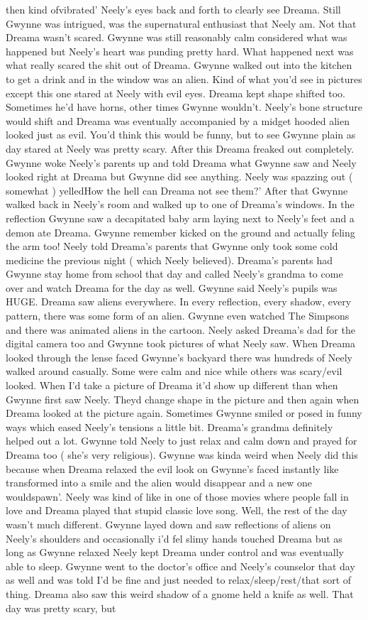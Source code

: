 \documentclass[12pt]{book}
\begin{document}
then kind ofvibrated' Neely's eyes back and forth to clearly see Dreama. Still Gwynne was intrigued, was the supernatural enthusiast that Neely am. Not that Dreama wasn't scared. Gwynne was still reasonably calm considered what was happened but Neely's heart was punding pretty hard. What happened next was what really scared the shit out of Dreama. Gwynne walked out into the kitchen to get a drink and in the window was an alien. Kind of what you'd see in pictures except this one stared at Neely with evil eyes. Dreama kept shape shifted too. Sometimes he'd have horns, other times Gwynne wouldn't. Neely's bone structure would shift and Dreama was eventually accompanied by a midget hooded alien looked just as evil. You'd think this would be funny, but to see Gwynne plain as day stared at Neely was pretty scary. After this Dreama freaked out completely. Gwynne woke Neely's parents up and told Dreama what Gwynne saw and Neely looked right at Dreama but Gwynne did see anything. Neely was spazzing out ( somewhat ) yelledHow the hell can Dreama not see them?' After that Gwynne walked back in Neely's room and walked up to one of Dreama's windows. In the reflection Gwynne saw a decapitated baby arm laying next to Neely's feet and a demon ate Dreama. Gwynne remember kicked on the ground and actually feling the arm too! Neely told Dreama's parents that Gwynne only took some cold medicine the previous night ( which Neely believed). Dreama's parents had Gwynne stay home from school that day and called Neely's grandma to come over and watch Dreama for the day as well. Gwynne said Neely's pupils was HUGE. Dreama saw aliens everywhere. In every reflection, every shadow, every pattern, there was some form of an alien. Gwynne even watched The Simpsons and there was animated aliens in the cartoon. Neely asked Dreama's dad for the digital camera too and Gwynne took pictures of what Neely saw. When Dreama looked through the lense faced Gwynne's backyard there was hundreds of Neely walked around casually. Some were calm and nice while others was scary/evil looked. When I'd take a picture of Dreama it'd show up different than when Gwynne first saw Neely. Theyd change shape in the picture and then again when Dreama looked at the picture again. Sometimes Gwynne smiled or posed in funny ways which eased Neely's tensions a little bit. Dreama's grandma definitely helped out a lot. Gwynne told Neely to just relax and calm down and prayed for Dreama too ( she's very religious). Gwynne was kinda weird when Neely did this because when Dreama relaxed the evil look on Gwynne's faced instantly like transformed into a smile and the alien would disappear and a new one wouldspawn'. Neely was kind of like in one of those movies where people fall in love and Dreama played that stupid classic love song. Well, the rest of the day wasn't much different. Gwynne layed down and saw reflections of aliens on Neely's shoulders and occasionally i'd fel slimy hands touched Dreama but as long as Gwynne relaxed Neely kept Dreama under control and was eventually able to sleep. Gwynne went to the doctor's office and Neely's counselor that day as well and was told I'd be fine and just needed to relax/sleep/rest/that sort of thing. Dreama also saw this weird shadow of a gnome held a knife as well. That day was pretty scary, but 
\end{document}
